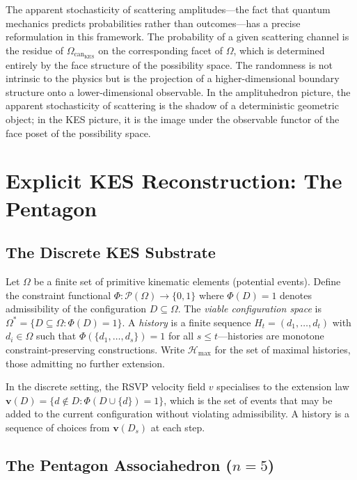 \documentclass[12pt, oneside]{amsart}
\theoremstyle{plain}
\theoremstyle{definition}
\theoremstyle{remark}
\newcommand{\Phif}{\Phi}
\newcommand{\vf}{v}
\newcommand{\OmKS}{\Omega}
\newcommand{\CF}{\Omega_{\mathrm{can}}}
\newcommand{\Hmax}{\mathcal{H}_{\max}}
\begin{document}
The apparent stochasticity of scattering amplitudes---the fact that quantum mechanics predicts probabilities rather than outcomes---has a precise reformulation in this framework. The probability of a given scattering channel is the residue of $\CF_{\mathrm{KES}}$ on the corresponding facet of $\OmKS$, which is determined entirely by the face structure of the possibility space. The randomness is not intrinsic to the physics but is the projection of a higher-dimensional boundary structure onto a lower-dimensional observable. In the amplituhedron picture, the apparent stochasticity of scattering is the shadow of a deterministic geometric object; in the KES picture, it is the image under the observable functor of the face poset of the possibility space.

\section{Explicit KES Reconstruction: The Pentagon}
\label{sec:discrete}

\subsection{The Discrete KES Substrate}

Let $\OmKS$ be a finite set of primitive kinematic elements (potential events). Define the constraint functional $\Phif: \mathcal{P}(\OmKS) \to \{0,1\}$ where $\Phif(D) = 1$ denotes admissibility of the configuration $D \subseteq \OmKS$. The \emph{viable configuration space} is $\OmKS^* = \{D \subseteq \OmKS : \Phif(D) = 1\}$. A \emph{history} is a finite sequence $H_t = (d_1, \ldots, d_t)$ with $d_i \in \OmKS$ such that $\Phif(\{d_1, \ldots, d_s\}) = 1$ for all $s \leq t$---histories are monotone constraint-preserving constructions. Write $\Hmax$ for the set of maximal histories, those admitting no further extension.

In the discrete setting, the RSVP velocity field $\vf$ specialises to the extension law $\mathbf{v}(D) = \{d \notin D : \Phif(D \cup \{d\}) = 1\}$, which is the set of events that may be added to the current configuration without violating admissibility. A history is a sequence of choices from $\mathbf{v}(D_s)$ at each step.

\subsection{The Pentagon Associahedron ($n = 5$)}
\end{document}
